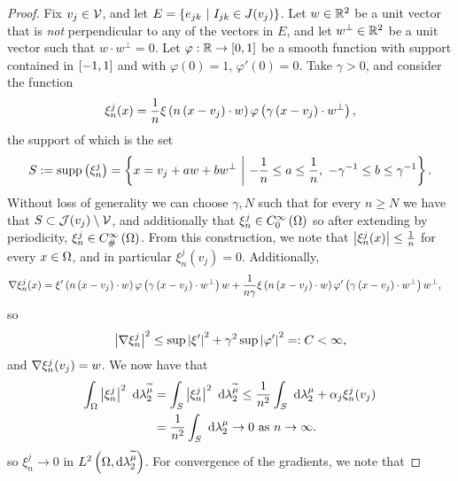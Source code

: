 \begin{proof}
	Fix $v_j\in\mathcal{V}$, and let $E = \left\{ e_{jk} \ \middle\vert \  I_{jk}\in J(v_j)  \right\}$.
	Let $w\in\mathbb{R}^2$ be a unit vector that is \emph{not} perpendicular to any of the vectors in $E$, and let $w^{\perp}\in\mathbb{R}^2$ be a unit vector such that $w\cdot w^{\perp}=0$. 
	Let $\varphi:\mathbb{R}\rightarrow\left[ 0,1 \right]$ be a smooth function with support contained in $\left[ -1,1 \right]$ and with $\varphi(0)=1$, $\varphi'(0)=0$.
	Take $\gamma>0$, and consider the function
	\begin{align*}
		\xi_n^j(x) = \frac{1}{n}\xi\left( n\left( x-v_j \right)\cdot w \right)\varphi\left( \gamma\left( x-v_j \right)\cdot w^{\perp} \right),
	\end{align*}
	the support of which is the set
	\begin{align*}
		S := \mathrm{supp}\left( \xi_n^j \right) =
		\left\{  x=v_j+aw+bw^{\perp} \ \middle\vert \  -\frac{1}{n}\leq a\leq\frac{1}{n}, \ -\gamma^{-1}\leq b\leq\gamma^{-1}  \right\}.
	\end{align*}
	Without loss of generality we can choose $\gamma, N$ such that for every $n\geq N$ we have that $S\subset\mathcal{J}(v_j)\setminus\mathcal{V}$, and additionally that $\xi_n^j\in C^{\infty}_{0}\left( \Omega \right)$ so after extending by periodicity, $\xi_n^j\in C^{\infty}_{\#}\left( \Omega \right)$.
	From this construction, we note that $\left\lvert \xi_n^j(x) \right\rvert\leq\frac{1}{n}$ for every $x\in\Omega$, and in particular $\xi_n^j(v_j)=0$.
	Additionally,
	\begin{align*}
		\nabla\xi_n^j(x) &= \xi'\left( n\left( x-v_j \right)\cdot w \right)\varphi\left( \gamma\left( x-v_j \right)\cdot w^{\perp} \right)w + \frac{1}{n\gamma}\xi\left( n\left( x-v_j \right)\cdot w \right)\varphi'\left( \gamma\left( x-v_j \right)\cdot w^{\perp} \right)w^{\perp},
	\end{align*}
	so
	\begin{align*}
		\left\lvert \nabla\xi_n^j \right\rvert^2 \leq \sup\left\lvert \xi' \right\rvert^2 + \gamma^2\sup\left\lvert \varphi' \right\rvert^2 =: C < \infty,
	\end{align*}
	and $\nabla\xi_n^j(v_j)=w$.
	We now have that
	\begin{align*}
		\int_{\Omega}\left\lvert \xi_n^j \right\rvert^2 \ \mathrm{d}\lambda_2^{\widetilde{\mu}}
		&= \int_{S}\left\lvert \xi_n^j \right\rvert^2 \ \mathrm{d}\lambda_2^{\widetilde{\mu}}
		\leq \frac{1}{n^2}\int_{S} \ \mathrm{d}\lambda_2^{\mu} + \alpha_j\xi_n^j(v_j) \\
		&= \frac{1}{n^2}\int_{S} \ \mathrm{d}\lambda_2^{\mu} \rightarrow 0 \ \text{as} \ n \rightarrow\infty.
	\end{align*}
	so $\xi_n^j\rightarrow0$ in $L^{2}\left( \Omega,\mathrm{d} \lambda_2^{\widetilde{\mu}} \right)$.
	For convergence of the gradients, we note that

\end{proof}
